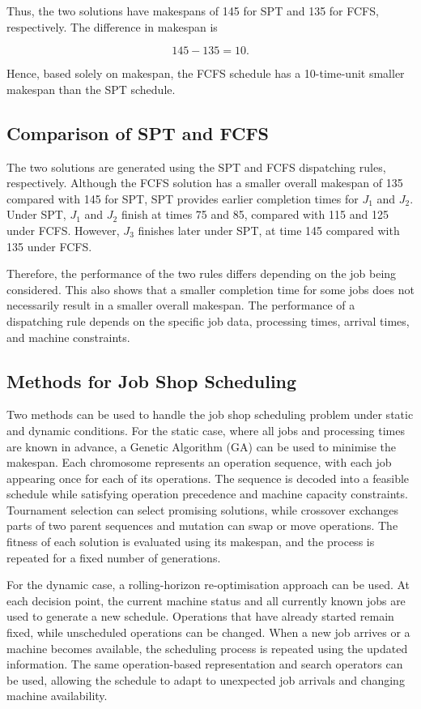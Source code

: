 \documentclass[a4paper,12pt]{article}
\begin{document}
Thus, the two solutions have makespans of 145 for SPT and 135 for FCFS, respectively. The difference in makespan is

$$
145-135=10.
$$

Hence, based solely on makespan, the FCFS schedule has a 10-time-unit smaller makespan than the SPT schedule.

\subsection{Comparison of SPT and FCFS}

The two solutions are generated using the SPT and FCFS dispatching rules, respectively. Although the FCFS solution has a smaller overall makespan of 135 compared with 145 for SPT, SPT provides earlier completion times for $J_1$ and $J_2$. Under SPT, $J_1$ and $J_2$ finish at times 75 and 85, compared with 115 and 125 under FCFS. However, $J_3$ finishes later under SPT, at time 145 compared with 135 under FCFS.

Therefore, the performance of the two rules differs depending on the job being considered. This also shows that a smaller completion time for some jobs does not necessarily result in a smaller overall makespan. The performance of a dispatching rule depends on the specific job data, processing times, arrival times, and machine constraints.

\subsection{Methods for Job Shop Scheduling}

Two methods can be used to handle the job shop scheduling problem under static and dynamic conditions. For the static case, where all jobs and processing times are known in advance, a Genetic Algorithm (GA) can be used to minimise the makespan. Each chromosome represents an operation sequence, with each job appearing once for each of its operations. The sequence is decoded into a feasible schedule while satisfying operation precedence and machine capacity constraints. Tournament selection can select promising solutions, while crossover exchanges parts of two parent sequences and mutation can swap or move operations. The fitness of each solution is evaluated using its makespan, and the process is repeated for a fixed number of generations.

For the dynamic case, a rolling-horizon re-optimisation approach can be used. At each decision point, the current machine status and all currently known jobs are used to generate a new schedule. Operations that have already started remain fixed, while unscheduled operations can be changed. When a new job arrives or a machine becomes available, the scheduling process is repeated using the updated information. The same operation-based representation and search operators can be used, allowing the schedule to adapt to unexpected job arrivals and changing machine availability.
\end{document}
